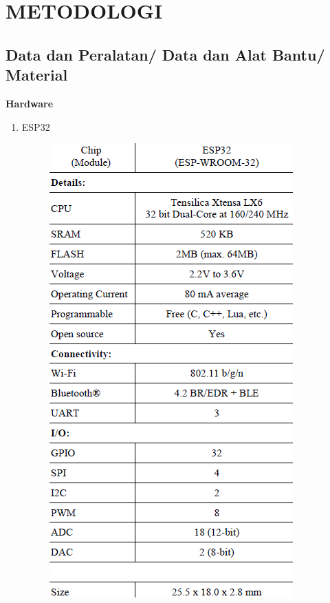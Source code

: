 \section{METODOLOGI}


\subsection{Data dan Peralatan/ Data dan Alat Bantu/ Material }
\label{sec:datadanperalatan}

\textbf{Hardware}
\begin{enumerate}[label=(\alph*)]
   \item ESP32
\begin{figure}[ht]
  \centering

  \includegraphics[scale=0.5]{gambar/tabelsatuu.png}


\end{figure}
\end{enumerate}
